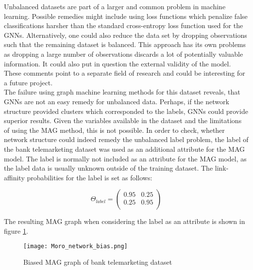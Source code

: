   \noindent Unbalanced datasets are part of a larger and common problem in 
  machine learning. Possible remedies might include using loss functions which 
  penalize false classifications harsher than the standard cross-entropy loss 
  function used for the GNNs. Alternatively, one could also reduce the data set 
  by dropping observations such that the remaining dataset is balanced. This 
  approach has its own problems as dropping a large number of observations 
  discards a lot of potentially valuable information. It could also put in 
  question the external validity of the model. These comments point to a 
  separate field of research and could be interesting for a future project. \\

  \noindent The failure using graph machine learning methods for this dataset
  reveals, that GNNs are not an easy remedy for unbalanced data. Perhaps, if the
  network structure provided clusters which corresponded to the labels, GNNs
  could provide superior results. Given the variables available in the dataset
  and the limitations of using the MAG method, this is not possible. In order
  to check, whether network structure could indeed remedy the unbalanced label
  problem, the label of the bank telemarketing dataset was used as an
  additional attribute for the MAG model. The label is normally not included as 
  an attribute for the MAG model, as the label data is usually unknown outside 
  of the training dataset. The link-affinity probabilities for the label is set
  as follows:

  \[ \Theta_{label} = 
	\begin{pmatrix}
        0.95 & 0.25 \\
		0.25 & 0.95 \\
	\end{pmatrix}
	\] 
  
  \noindent The resulting MAG graph when considering the label as an attribute 
  is shown in figure \ref{fig:Moro_bias}.

  \begin{figure}[h]
		\centering
		\texttt{[image: Moro\_network\_bias.png]}
		\caption{Biased MAG graph of bank telemarketing dataset}
        \label{fig:Moro_bias}
  \end{figure}

